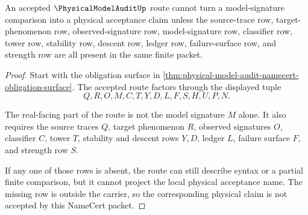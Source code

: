 \begin{theorem}
\label{thm:physical-model-audit-acceptance-nonescape}
An accepted $\PhysicalModelAuditUp$ route cannot turn a model-signature comparison into a physical acceptance claim unless the source-trace row, target-phenomenon row, observed-signature row, model-signature row, classifier row, tower row, stability row, descent row, ledger row, failure-surface row, and strength row are all present in the same finite packet.
\end{theorem}
\begin{proof}
Start with the obligation surface in \autoref{thm:physical-model-audit-namecert-obligation-surface}. The accepted route factors through the displayed tuple
$$
Q,R,O,M,C,T,Y,D,L,F,S,H,U,P,N.
$$

The real-facing part of the route is not the model signature $M$ alone. It also requires the source traces $Q$, target phenomenon $R$, observed signatures $O$, classifier $C$, tower $T$, stability and descent rows $Y,D$, ledger $L$, failure surface $F$, and strength row $S$.

If any one of those rows is absent, the route can still describe syntax or a partial finite comparison, but it cannot project the local physical acceptance name. The missing row is outside the carrier, so the corresponding physical claim is not accepted by this NameCert packet.
\end{proof}

